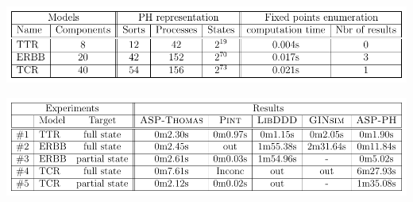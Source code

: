 \begin{table}

\includegraphics[width=\textwidth]{images/table1.pdf}
\caption{\label{tab:models}%
Description of the models used in our tests and results of our fixed point enumeration.
Each model is referred to by its short name, where
TTR stands for the tadpole tail resorption model, %
ERBB for the receptor-regulated G1/S transition of the same name %
and TCR for the T-cell receptor signaling network. %
For each of them, this table gives the number of biological components
in the original representation,
and the number of sorts, the number of processes
and the number of states in the PH model.
Finally, the last column gives the computation time for the enumeration of all fixed points
and the number of results returned.
}
\end{table}

\begin{table}[ht]
\includegraphics[width=\textwidth]{images/table2}
\caption{\label{tab:reachability}%
Compared performances of several methods to compute reachability analyses:
the method of Rocca \textit{et al.} (denoted by \textsc{ASP-Thomas}), \textsc{Pint}, \textsc{LibDDD}, \textsc{GINsim} and our new method presented in this paper, called \textsc{ASP-PH}.
For each test, this table gives the short name of the considered model,
as given in table~\ref{tab:models},
the type of goal (either a whole state or a sub-state)
and the computation time of the different methods used for the tests,
where ``out'' marks an execution taking too much time or memory,
\mbox{``~-~''} indicates that is not possible to do the test,
and ``Inconc'' states that the method terminates without a response.
}
\end{table}

